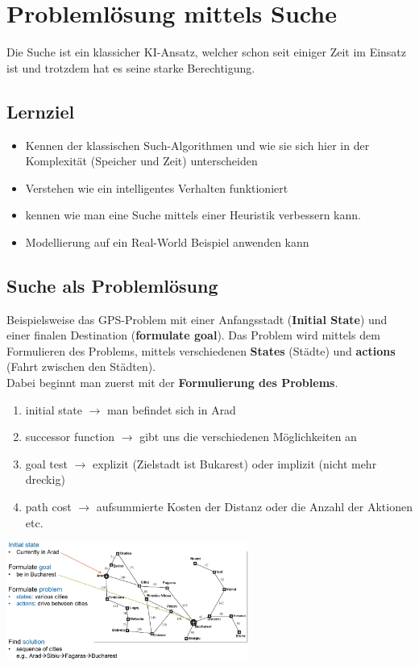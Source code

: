 \documentclass{article}
\newenvironment{Figure}
	{\par\medskip\noindent\minipage{\linewidth}}
	{\endminipage\par\medskip}
\theoremstyle{merke}
\theoremstyle{definition}
\begin{document}
\section{Problemlösung mittels Suche}
Die Suche ist ein klassicher KI-Ansatz, welcher schon seit einiger Zeit im Einsatz ist und trotzdem hat es seine starke Berechtigung.\\

\subsection{Lernziel}
\begin{itemize}
\item Kennen der klassischen Such-Algorithmen und wie sie sich hier in der Komplexität (Speicher und Zeit) unterscheiden
\item Verstehen wie ein intelligentes Verhalten funktioniert
\item kennen wie man eine Suche mittels einer Heuristik verbessern kann.
\item Modellierung auf ein Real-World Beispiel anwenden kann
\end{itemize}

\subsection{Suche als Problemlösung}
Beispielsweise das GPS-Problem mit einer Anfangsstadt (\textbf{Initial State}) und einer finalen Destination (\textbf{formulate goal}). Das Problem wird mittels dem Formulieren des Problems, mittels verschiedenen \textbf{States} (Städte) und \textbf{actions} (Fahrt zwischen den Städten).\\

Dabei beginnt man zuerst mit der \textbf{Formulierung des Problems}.
\begin{enumerate}
\item initial state $\rightarrow$ man befindet sich in Arad
\item successor function $\rightarrow$ gibt uns die verschiedenen Möglichkeiten an
\item goal test $\rightarrow$ explizit (Zielstadt ist Bukarest) oder implizit (nicht mehr dreckig)
\item path cost $\rightarrow$ aufsummierte Kosten der Distanz oder die Anzahl der Aktionen etc.
\end{enumerate}
\begin{Figure}
\centering
\includegraphics[width=300px]{img/SearchingAsProblemSolvingGPS.png}
	\label{fig:Real-World Beispiel für eine Baumsuche}
\end{Figure}
\end{document}
